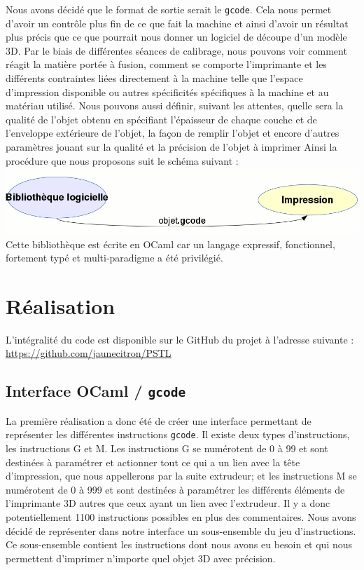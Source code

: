 \documentclass[11pt, titlepage]{article}
\begin{document}
Nous avons décidé que le format de sortie serait le \verb&gcode&. Cela nous permet d'avoir un contrôle plus fin de ce que fait la machine et ainsi d'avoir un résultat plus précis que ce que pourrait nous donner un logiciel de découpe d'un modèle 3D.
Par le biais de différentes séances de calibrage, nous pouvons voir comment réagit la matière portée à fusion, comment se comporte l'imprimante et les différents contraintes liées directement à la machine telle que l'espace d'impression disponible ou autres spécificités spécifiques à la machine et au matériau utilisé.
Nous pouvons aussi définir, suivant les attentes, quelle sera la qualité de l'objet obtenu en spécifiant l'épaisseur de chaque couche et de l'enveloppe extérieure de l'objet, la façon de remplir l'objet et encore d'autres paramètres jouant sur la qualité et la précision de l'objet à imprimer
Ainsi la procédure que nous proposons suit le schéma suivant :
\includegraphics[scale=1]{img/Motivation.png} 
Cette bibliothèque est écrite en OCaml car un langage expressif, fonctionnel, fortement typé et multi-paradigme a été privilégié.

\newpage
\section{Réalisation}
L'intégralité du code est disponible sur le GitHub du projet à l'adresse suivante :
\url{https://github.com/jaunecitron/PSTL}

\subsection{Interface OCaml / \verb&gcode&}
La première réalisation a donc été de créer une interface permettant de représenter les différentes instructions \verb&gcode&. Il existe deux types d'instructions, les instructions G et M. Les instructions G se numérotent de 0 à 99 et sont destinées à paramétrer et actionner tout ce qui a un lien avec la tête d'impression, que nous appellerons par la suite extrudeur; et les instructions M se numérotent de 0 à 999 et sont destinées à paramétrer les différents éléments de l'imprimante 3D autres que ceux ayant un lien avec l'extrudeur. Il y a donc potentiellement 1100 instructions possibles en plus des commentaires.
Nous avons décidé de représenter dans notre interface un sous-ensemble du jeu d'instructions. Ce sous-ensemble contient les instructions dont nous avons eu besoin et qui nous permettent d'imprimer n'importe quel objet 3D avec précision.
\newline
\end{document}
